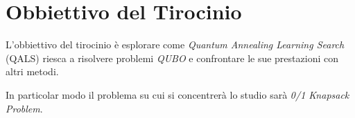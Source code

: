 \documentclass[12pt,a4paper,oneside]{report}
\begin{document}
\chapter*{Obbiettivo del Tirocinio}

L'obbiettivo del tirocinio è esplorare come \emph{Quantum Annealing Learning Search} (QALS) riesca
a risolvere problemi \emph{QUBO} e confrontare le sue prestazioni con altri metodi.

In particolar modo il problema su cui si concentrerà lo studio sarà  \emph{{0/1} Knapsack Problem}.
\end{document}
